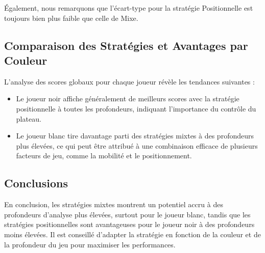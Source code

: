 Également, nous remarquons que l'écart-type pour la stratégie Positionnelle est toujours bien plus faible que celle de Mixe. 

\subsection{Comparaison des Stratégies et Avantages par Couleur}

L'analyse des scores globaux pour chaque joueur révèle les tendances suivantes :

\begin{itemize}
    \item Le joueur noir affiche généralement de meilleurs scores avec la stratégie positionnelle à toutes les profondeurs, indiquant l'importance du contrôle du plateau.
    \item Le joueur blanc tire davantage parti des stratégies mixtes à des profondeurs plus élevées, ce qui peut être attribué à une combinaison efficace de plusieurs facteurs de jeu, comme la mobilité et le positionnement.
\end{itemize}

\subsection*{Conclusions}

En conclusion, les stratégies mixtes montrent un potentiel accru à des profondeurs d'analyse plus élevées, surtout pour le joueur blanc, tandis que les stratégies positionnelles sont avantageuses pour le joueur noir à des profondeurs moins élevées. Il est conseillé d'adapter la stratégie en fonction de la couleur et de la profondeur du jeu pour maximiser les performances.


